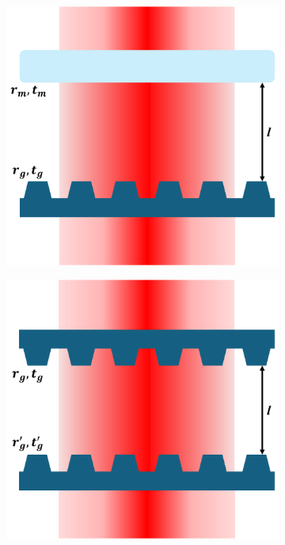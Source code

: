 \begin{figure}[h!]
    \centering
    \begin{subfigure}[b]{0.3\textwidth}
        \includegraphics[width=\textwidth]{figures/single_fano_sketch.pdf}
        \caption{}
        \label{fig:single_fano_sketch2}
    \end{subfigure}
    \hspace{1cm}
    \begin{subfigure}[b]{0.3\textwidth}
        \includegraphics[width=\textwidth]{figures/double_fano_sketch.pdf}

\end{subfigure}
\end{figure}
